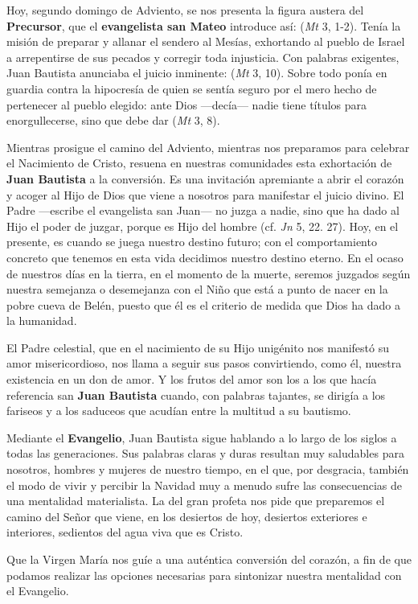 				\begin{body}
					[\ldots{}] Hoy, segundo domingo de Adviento, se nos presenta la figura austera del \textbf{Precursor}, que el \textbf{evangelista san Mateo} introduce así:  (\emph{Mt} 3, 1-2). Tenía la misión de preparar y allanar el sendero al Mesías, exhortando al pueblo de Israel a arrepentirse de sus pecados y corregir toda injusticia. Con palabras exigentes, Juan Bautista anunciaba el juicio inminente:  (\emph{Mt} 3, 10). Sobre todo ponía en guardia contra la hipocresía de quien se sentía seguro por el mero hecho de pertenecer al pueblo elegido: ante Dios ---decía--- nadie tiene títulos para enorgullecerse, sino que debe dar  (\emph{Mt} 3, 8).
					
					Mientras prosigue el camino del Adviento, mientras nos preparamos para celebrar el Nacimiento de Cristo, resuena en nuestras comunidades esta exhortación de \textbf{Juan Bautista} a la conversión. Es una invitación apremiante a abrir el corazón y acoger al Hijo de Dios que viene a nosotros para manifestar el juicio divino. El Padre ---escribe el evangelista san Juan--- no juzga a nadie, sino que ha dado al Hijo el poder de juzgar, porque es Hijo del hombre (cf. \emph{Jn} 5, 22. 27). Hoy, en el presente, es cuando se juega nuestro destino futuro; con el comportamiento concreto que tenemos en esta vida decidimos nuestro destino eterno. En el ocaso de nuestros días en la tierra, en el momento de la muerte, seremos juzgados según nuestra semejanza o desemejanza con el Niño que está a punto de nacer en la pobre cueva de Belén, puesto que él es el criterio de medida que Dios ha dado a la humanidad.
					
					El Padre celestial, que en el nacimiento de su Hijo unigénito nos manifestó su amor misericordioso, nos llama a seguir sus pasos convirtiendo, como él, nuestra existencia en un don de amor. Y los frutos del amor son los  a los que hacía referencia san \textbf{Juan Bautista} cuando, con palabras tajantes, se dirigía a los fariseos y a los saduceos que acudían entre la multitud a su bautismo.
					
					Mediante el \textbf{Evangelio}, Juan Bautista sigue hablando a lo largo de los siglos a todas las generaciones. Sus palabras claras y duras resultan muy saludables para nosotros, hombres y mujeres de nuestro tiempo, en el que, por desgracia, también el modo de vivir y percibir la Navidad muy a menudo sufre las consecuencias de una mentalidad materialista. La  del gran profeta nos pide que preparemos el camino del Señor que viene, en los desiertos de hoy, desiertos exteriores e interiores, sedientos del agua viva que es Cristo.
					
					Que la Virgen María nos guíe a una auténtica conversión del corazón, a fin de que podamos realizar las opciones necesarias para sintonizar nuestra mentalidad con el Evangelio.
				\end{body}
			
